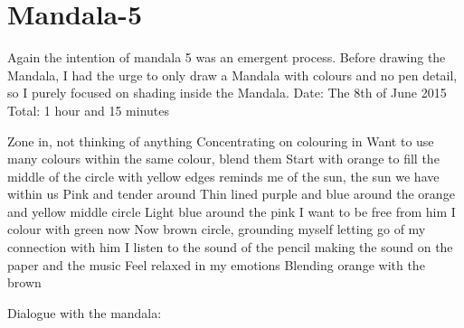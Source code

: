 \chapter{Mandala-5}


Again the intention of mandala 5 was an emergent process. Before drawing the Mandala, I had the urge to only draw a Mandala with colours and no pen detail, so I purely focused on shading inside the Mandala. 
Date: The 8th of June 2015
Total: 1 hour and 15 minutes

Zone in, not thinking of anything 
Concentrating on colouring in
Want to use many colours within the same colour, blend them
Start with orange to fill the middle of the circle with yellow edges reminds me of the sun, the sun we have within us
Pink and tender around
Thin lined purple and blue around the orange and yellow middle circle 
Light blue around the pink 
I want to be free from him
I colour with green now
Now brown circle, grounding myself letting go of my connection with him
I listen to the sound of the pencil making the sound on the paper and the music 
Feel relaxed in my emotions 
Blending orange with the brown 


Dialogue with the mandala:

